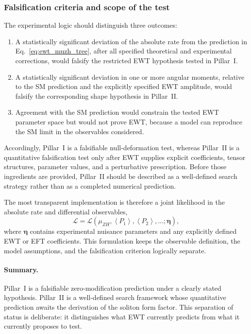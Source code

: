 \documentclass[10pt,a4paper]{article}
\begin{document}
\subsubsection{Falsification criteria and scope of the test}
\label{sec:ewt_falsification_scope}

The experimental logic should distinguish three outcomes:
\begin{enumerate}
	\item A statistically significant deviation of the absolute rate from the prediction in Eq.~\eqref{eq:ewt_muzh_tree}, after all specified theoretical and experimental corrections, would falsify the restricted EWT hypothesis tested in Pillar~I.
	\item A statistically significant deviation in one or more angular moments, relative to the SM prediction and the explicitly specified EWT amplitude, would falsify the corresponding shape hypothesis in Pillar~II.
	\item Agreement with the SM prediction would constrain the tested EWT parameter space but would not prove EWT, because a model can reproduce the SM limit in the observables considered.
\end{enumerate}

Accordingly, Pillar~I is a falsifiable null-deformation test, whereas Pillar~II is a quantitative falsification test only after EWT supplies explicit coefficients, tensor structures, parameter values, and a perturbative prescription. Before those ingredients are provided, Pillar~II should be described as a well-defined search strategy rather than as a completed numerical prediction.

The most transparent implementation is therefore a joint likelihood in the absolute rate and differential observables,
\begin{equation}
	\mathcal{L}
	=
	\mathcal{L}\!\left(
	\mu_{ZH},
	\left\langle P_1\right\rangle,
	\left\langle P_2\right\rangle,
	\ldots;
	\boldsymbol{\eta}
	\right),
\end{equation}
where $\boldsymbol{\eta}$ contains experimental nuisance parameters and any explicitly defined EWT or EFT coefficients. This formulation keeps the observable definition, the model assumptions, and the falsification criterion logically separate.

\paragraph{Summary.} Pillar~I is a falsifiable zero-modification
prediction under a clearly stated hypothesis. Pillar~II is a
well-defined search framework whose quantitative prediction awaits
the derivation of the soliton form factor. This separation of status
is deliberate: it distinguishes what EWT currently predicts from what
it currently proposes to test.
\end{document}
